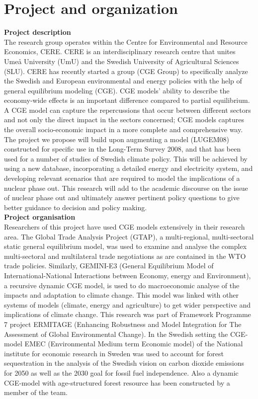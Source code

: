 \section{Project and organization}
\textbf{Project description}\\
The research group operates within the Centre for Environmental and Resource Economics, CERE. CERE is an interdisciplinary research centre that unites Umeå University (UmU) and the Swedish University of Agricultural Sciences (SLU). CERE has recently started a group (CGE Group) to specifically analyze the Swedish and European environmental and energy policies with the help of general equilibrium modeling (CGE). CGE models' ability to describe the economy-wide effects is an important difference compared to partial equilibrium. A CGE model can capture the repercussions that occur between different sectors and not only the direct impact in the sectors concerned; CGE models captures the overall socio-economic impact in a more complete and comprehensive way. The project we propose will build upon augmenting a model (LUGEM08) constructed for specific use in the Long-Term Survey 2008, and that has been used for a number of studies of Swedish climate policy. This will be achieved by using a new database, incorporating a detailed energy and electricity system, and developing relevant scenarios that are required to model the implications of a nuclear phase out. This research will add to the academic discourse on the issue of nuclear phase out and ultimately answer pertinent policy questions to give better guidance to decision and policy making.\\

\textbf{Project organisation}\\
Researchers of this project have used CGE models extensively in their research area. The Global Trade Analysis Project (GTAP), a multi-regional, multi-sectoral static general equilibrium model, was used to examine and analyse the complex multi-sectoral and multilateral trade negotiations as are contained in the WTO trade policies. Similarly, GEMINI-E3 (General Equilibrium Model of International-National Interactions between Economy, energy and Environment), a recursive dynamic CGE model, is used to do macroeconomic analyse of the impacts and adaptation to climate change. This model was linked with other systems of models (climate, energy and agriculture) to get wider perspective and implications of climate change. This research was part of Framework Programme 7 project ERMITAGE (Enhancing Robustness and Model Integration for The Assessment of Global Environmental Change). In the Swedish setting the CGE-model EMEC (Environmental Medium term Economic model) of the National institute for economic research in Sweden was used to account for forest sequestration in the analysis of the Swedish vision on carbon dioxide emissions for 2050 as well as the 2030 goal for fossil fuel independence. Also a dynamic CGE-model with age-structured forest resource \citep{furtenback2011three} has been constructed by a member of the team.\\

